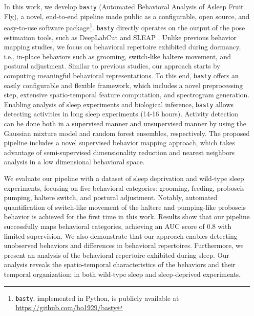 In this work, we develop \texttt{basty} (Automated \underline{B}ehavioral \underline{A}nalysis of A\underline{s}leep Frui\underline{t} Fl\underline{y}), a novel, end-to-end pipeline made public as a configurable, open source, and easy-to-use software package\footnote{\texttt{basty}, implemented in Python, is publicly available at \url{https://github.com/bo1929/basty}}.
\texttt{basty} directly operates on the output of the pose estimation tools, such as DeepLabCut \citep{mathis_deeplabcut_2018} and SLEAP \cite{pereira_sleap_2022}.
Unlike previous behavior mapping studies, we focus on behavioral repertoire exhibited during dormancy, i.e., in-place behaviors such as grooming, switch-like haltere movement, and postural adjustment.
Similar to previous studies, our approach starts by computing meaningful behavioral representations.
To this end, \texttt{basty} offers an easily configurable and flexible framework, which includes a novel preprocessing step, extensive spatio-temporal feature computation, and spectrogram generation.
Enabling analysis of sleep experiments and biological inference, \texttt{basty} allows detecting activities in long sleep experiments (14-16 hours).
Activity detection can be done both in a supervised manner and unsupervised manner by using the Gaussian mixture model and random forest ensembles, respectively.
The proposed pipeline includes a novel supervised behavior mapping approach, which takes advantage of semi-supervised dimensionality reduction and nearest neighbors analysis in a low dimensional behavioral space.

We evaluate our pipeline with a dataset of sleep deprivation and wild-type sleep experiments, focusing on five behavioral categories: grooming, feeding, proboscis pumping, haltere switch, and postural adjustment.
Notably, automated quantification of switch-like movement of the haltere and pumping-like proboscis behavior is achieved for the first time in this work.
Results show that our pipeline successfully maps behavioral categories, achieving an AUC score of 0.8 with limited supervision.
We also demonstrate that our approach enables detecting unobserved behaviors and differences in behavioral repertoires.
Furthermore, we present an analysis of the behavioral repertoire exhibited during sleep.
Our analysis reveals the spatio-temporal characteristics of the behaviors and their temporal organization; in both wild-type sleep and sleep-deprived experiments.

